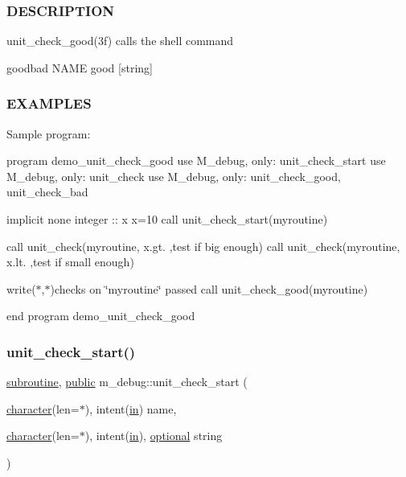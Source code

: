 \subsubsection*{D\+E\+S\+C\+R\+I\+P\+T\+I\+ON}

\begin{DoxyVerb}unit_check_good(3f) calls the shell command

     goodbad NAME good [string]
\end{DoxyVerb}


\subsubsection*{E\+X\+A\+M\+P\+L\+ES}

Sample program\+:

program demo\+\_\+unit\+\_\+check\+\_\+good use M\+\_\+debug, only\+: unit\+\_\+check\+\_\+start use M\+\_\+debug, only\+: unit\+\_\+check use M\+\_\+debug, only\+: unit\+\_\+check\+\_\+good, unit\+\_\+check\+\_\+bad

implicit none integer \+:\+: x x=10 call unit\+\_\+check\+\_\+start(\textquotesingle{}myroutine\textquotesingle{})

call unit\+\_\+check(\textquotesingle{}myroutine\textquotesingle{}, x.\+gt. ,\textquotesingle{}test if big enough\textquotesingle{}) call unit\+\_\+check(\textquotesingle{}myroutine\textquotesingle{}, x.\+lt. ,\textquotesingle{}test if small enough\textquotesingle{})

write($\ast$,$\ast$)\textquotesingle{}checks on \char`\"{}myroutine\char`\"{} passed\textquotesingle{} call unit\+\_\+check\+\_\+good(\textquotesingle{}myroutine\textquotesingle{})

end program demo\+\_\+unit\+\_\+check\+\_\+good \mbox{\label{namespacem__debug_a6f1166b1f25f39931359c1aa1b2219e5}} 
\subsubsection{\texorpdfstring{unit\+\_\+check\+\_\+start()}{unit\_check\_start()}}
{\footnotesize\ttfamily \hyperlink{M__stopwatch_83_8txt_acfbcff50169d691ff02d4a123ed70482}{subroutine}, \hyperlink{M__stopwatch_83_8txt_a2f74811300c361e53b430611a7d1769f}{public} m\+\_\+debug\+::unit\+\_\+check\+\_\+start (\begin{DoxyParamCaption}\item[{\hyperlink{option__stopwatch_83_8txt_abd4b21fbbd175834027b5224bfe97e66}{character}(len=$\ast$), intent(\hyperlink{M__journal_83_8txt_afce72651d1eed785a2132bee863b2f38}{in})}]{name,  }\item[{\hyperlink{option__stopwatch_83_8txt_abd4b21fbbd175834027b5224bfe97e66}{character}(len=$\ast$), intent(\hyperlink{M__journal_83_8txt_afce72651d1eed785a2132bee863b2f38}{in}), \hyperlink{option__stopwatch_83_8txt_aa4ece75e7acf58a4843f70fe18c3ade5}{optional}}]{string }\end{DoxyParamCaption})}



